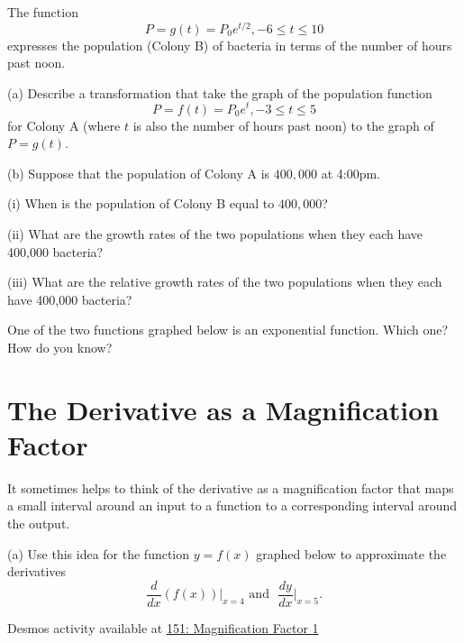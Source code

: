 \documentclass{ximera}
\begin{document}
\begin{question}  \label{Qcgt4ghggyt4r}
The function
\[
     P = g(t) = P_0 e^{t/2}, -6 \leq t \leq 10
\]
expresses the population (Colony B) of bacteria in terms of the number of hours past noon.

(a) Describe a transformation that take the graph of the population function 
\[
           P = f(t) = P_0 e^t , -3\leq t \leq 5 
\]
for Colony A (where $t$ is also the number of hours past noon) to the graph of $P=g(t)$.

(b) Suppose that the population of Colony A is $400,000$ at 4:00pm.

(i) When is the population of Colony B equal to $400,000$?

(ii) What are the growth rates of the two populations when they each have 400,000 bacteria?

(iii) What are the relative growth rates of the two populations when they each have 400,000 bacteria?

\end{question}


\begin{question} \label{Qdcvbrtt}
One of the two functions graphed below is an exponential function. Which one? How do you know?
\end{question}



\section*{The Derivative as a Magnification Factor}
\begin{exploration}   \label{Ex:325gyt}

It sometimes helps to think of the derivative as a magnification factor that maps a small interval around an input to a function to a corresponding interval around the output.

(a) Use this idea for the function $y=f(x)$ graphed below to approximate the derivatives 
\[
    \frac{d}{dx} (f(x))\Big|_{x=4} \text{  and  } \,\, \frac{dy}{dx}\Big|_{x=5} .
\]


\begin{onlineOnly}
    \begin{center}
\end{center}
\end{onlineOnly}


Desmos activity available at \href{https://www.desmos.com/calculator/la4f5ots3r}{151: Magnification Factor 1}

\end{exploration}
\end{document}
